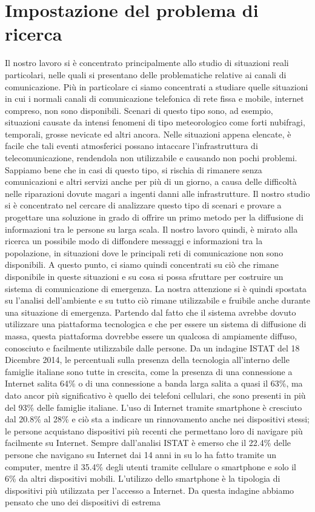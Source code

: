 \chapter{Impostazione del problema di ricerca}
\label{chap:impost_prob_ricerca}

Il nostro lavoro si è concentrato principalmente allo studio di situazioni reali particolari, nelle quali si presentano delle problematiche relative ai canali di comunicazione. Più in particolare ci siamo concentrati a studiare quelle situazioni in cui i normali canali di comunicazione telefonica di rete fissa e mobile, internet compreso, non sono disponibili. Scenari di questo tipo sono, ad esempio, situazioni causate da intensi fenomeni di tipo meteorologico come forti nubifragi, temporali, grosse nevicate ed altri ancora. Nelle situazioni appena elencate, è facile che tali eventi atmosferici possano intaccare l'infrastruttura di telecomunicazione, rendendola non utilizzabile e causando non pochi problemi. Sappiamo bene che in casi di questo tipo, si rischia di rimanere senza comunicazioni e altri servizi anche per più di un giorno, a causa delle difficoltà nelle riparazioni dovute magari a ingenti danni alle infrastrutture. Il nostro studio si è concentrato nel cercare di analizzare questo tipo di scenari e provare a progettare una soluzione in grado di offrire un primo metodo per la diffusione di informazioni tra le persone su larga scala. Il nostro lavoro quindi, è mirato alla ricerca un possibile modo di diffondere messaggi e informazioni tra la popolazione, in situazioni dove le principali reti di comunicazione non sono disponibili. A questo punto, ci siamo quindi concentrati su ciò che rimane disponibile in queste situazioni e su cosa si possa sfruttare per costruire un sistema di comunicazione di emergenza. La nostra attenzione si è quindi spostata su l'analisi dell'ambiente e su tutto ciò rimane utilizzabile e fruibile anche durante una situazione di emergenza. Partendo dal fatto che il sistema avrebbe dovuto utilizzare una piattaforma tecnologica e che per essere un sistema di diffusione di massa, questa piattaforma dovrebbe essere un qualcosa di ampiamente diffuso, conosciuto e facilmente utilizzabile dalle persone. Da un indagine ISTAT \cite{istat2014} del 18 Dicembre 2014, le percentuali sulla presenza della tecnologia all'interno delle famiglie italiane sono tutte in crescita, come la presenza di una connessione a Internet salita 64\% o di una connessione a banda larga salita a quasi il 63\%, ma dato ancor più significativo è quello dei telefoni cellulari, che sono presenti in più del 93\% delle famiglie italiane. L'uso di Internet tramite smartphone è cresciuto dal 20.8\% al 28\% e ciò sta a indicare un rinnovamento anche nei dispositivi stessi; le persone acquistano dispositivi più recenti che permettano loro di navigare più facilmente su Internet. Sempre dall'analisi ISTAT è emerso che il 22.4\% delle persone che navigano su Internet dai 14 anni in su lo ha fatto tramite un computer, mentre il 35.4\% degli utenti tramite cellulare o smartphone e solo il 6\% da altri dispositivi mobili. L'utilizzo dello smartphone è la tipologia di dispositivi più utilizzata per l'accesso a Internet. Da questa indagine abbiamo pensato che uno dei dispositivi di estrema 